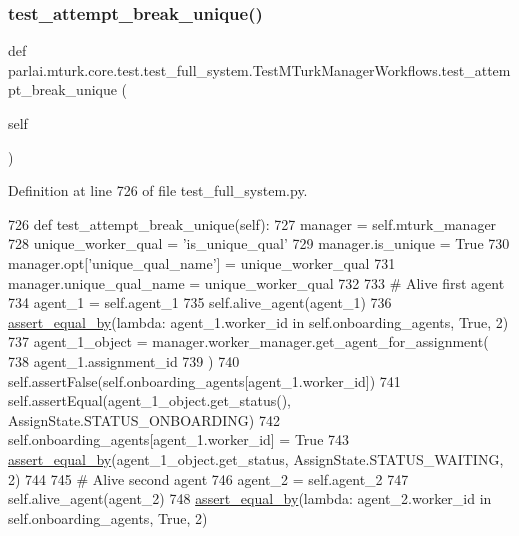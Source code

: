 \subsubsection{\texorpdfstring{test\+\_\+attempt\+\_\+break\+\_\+unique()}{test\_attempt\_break\_unique()}}
{\footnotesize\ttfamily def parlai.\+mturk.\+core.\+test.\+test\+\_\+full\+\_\+system.\+Test\+M\+Turk\+Manager\+Workflows.\+test\+\_\+attempt\+\_\+break\+\_\+unique (\begin{DoxyParamCaption}\item[{}]{self }\end{DoxyParamCaption})}



Definition at line 726 of file test\+\_\+full\+\_\+system.\+py.


\begin{DoxyCode}
726     \textcolor{keyword}{def }test\_attempt\_break\_unique(self):
727         manager = self.mturk\_manager
728         unique\_worker\_qual = \textcolor{stringliteral}{'is\_unique\_qual'}
729         manager.is\_unique = \textcolor{keyword}{True}
730         manager.opt[\textcolor{stringliteral}{'unique\_qual\_name'}] = unique\_worker\_qual
731         manager.unique\_qual\_name = unique\_worker\_qual
732 
733         \textcolor{comment}{# Alive first agent}
734         agent\_1 = self.agent\_1
735         self.alive\_agent(agent\_1)
736         \hyperlink{namespaceparlai_1_1mturk_1_1core_1_1test_1_1test__full__system_a0b463246d35658a2e422010f13dcf819}{assert\_equal\_by}(\textcolor{keyword}{lambda}: agent\_1.worker\_id \textcolor{keywordflow}{in} self.onboarding\_agents, \textcolor{keyword}{True}, 2)
737         agent\_1\_object = manager.worker\_manager.get\_agent\_for\_assignment(
738             agent\_1.assignment\_id
739         )
740         self.assertFalse(self.onboarding\_agents[agent\_1.worker\_id])
741         self.assertEqual(agent\_1\_object.get\_status(), AssignState.STATUS\_ONBOARDING)
742         self.onboarding\_agents[agent\_1.worker\_id] = \textcolor{keyword}{True}
743         \hyperlink{namespaceparlai_1_1mturk_1_1core_1_1test_1_1test__full__system_a0b463246d35658a2e422010f13dcf819}{assert\_equal\_by}(agent\_1\_object.get\_status, AssignState.STATUS\_WAITING, 2)
744 
745         \textcolor{comment}{# Alive second agent}
746         agent\_2 = self.agent\_2
747         self.alive\_agent(agent\_2)
748         \hyperlink{namespaceparlai_1_1mturk_1_1core_1_1test_1_1test__full__system_a0b463246d35658a2e422010f13dcf819}{assert\_equal\_by}(\textcolor{keyword}{lambda}: agent\_2.worker\_id \textcolor{keywordflow}{in} self.onboarding\_agents, \textcolor{keyword}{True}, 2)

\end{DoxyCode}
